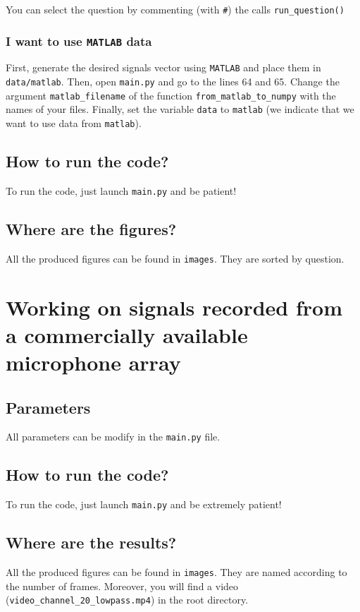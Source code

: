 \documentclass[8pt]{article}
\begin{document}
You can select the question by commenting (with \texttt{\#}) the calls \texttt{run\_question()}
\subsubsection{I want to use \texttt{MATLAB} data}
First, generate the desired signals vector using \texttt{MATLAB} and place them in \texttt{data/matlab}. Then, open \texttt{main.py} and go to the lines 64 and 65. Change the argument \texttt{matlab\_filename} of the function \texttt{from\_matlab\_to\_numpy} with the names of your files. Finally, set the variable \texttt{data} to \texttt{matlab} (we indicate that we want to use data from \texttt{matlab}).
\subsection{How to run the code?}
To run the code, just launch \texttt{main.py} and be patient!
\subsection{Where are the figures?}
All the produced figures can be found in \texttt{images}. They are sorted by question.
\section{Working on signals recorded from a commercially available microphone array}
\subsection{Parameters}
All parameters can be modify in the  \texttt{main.py} file.
\subsection{How to run the code?}
To run the code, just launch \texttt{main.py} and be extremely patient!
\subsection{Where are the results?}
All the produced figures can be found in \texttt{images}. They are named according to the number of frames. Moreover, you will find a video (\texttt{video\_channel\_20\_lowpass.mp4}) in the root directory.
\end{document}
